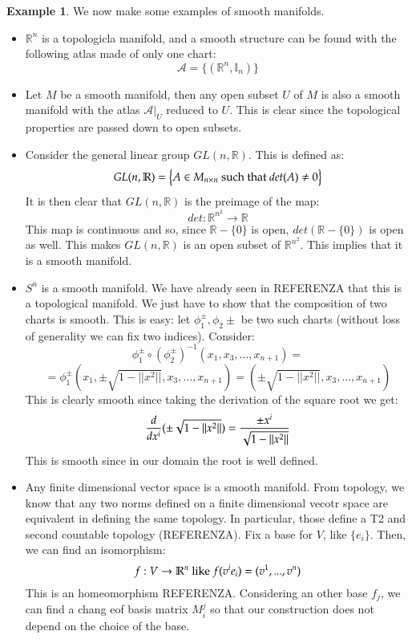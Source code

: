\documentclass[12pt,a4paper]{report}
\theoremstyle{definition}
\theoremstyle{Theorem}
\theoremstyle{break}
\newtheorem{Ex}[Def]{Example}
\theoremstyle{definition}
\begin{document}
		\begin{Ex}
			We now make some examples of smooth manifolds.
			\begin{itemize}
				\item $\mathbb{R}^n$ is a topologicla manifold, and a smooth structure can be found with the following atlas made of only one chart:
				$$\mathcal{A}=\{(\mathbb{R}^n,\mathbb{I}_n)\}$$
				\item Let $M$ be a smooth manifold, then any open subset $U$ of $M$ is also a smooth manifold with the atlas $\mathcal{A}\big|_U$ reduced to $U$. This is clear since the topological properties are passed down to open subsets.
				\item Consider the general linear group $GL(n,\mathbb{R})$. This is defined as:
				$$GL(n,\mathbb{R})=\big\{A\in M_{n\times n}\hbox{ such that }det(A)\neq 0\big\}$$
				It is then clear that $GL(n,\mathbb{R})$ is the preimage of the map:
				$$det:\mathbb{R}^{n^2}\longrightarrow \mathbb{R}$$ 
				This map is continuous and so, since $\mathbb{R}-\{0\}$ is open, $det(\mathbb{R}-\{0\})$ is open as well. This makes $GL(n,\mathbb{R})$ is an open subset of $\mathbb{R}^{n^2}$. This implies that it is a smooth manifold.
				\item $S^n$ is a smooth manifold. We have already seen in REFERENZA that this is a topological manifold. We just have to show that the composition of two charts is smooth. This is easy: let $\phi_1^\pm,\phi_2\pm$ be two such charts (without loss of generality we can fix two indices). Consider:
				$$\phi_1^{\pm}\circ(\phi_2^{\pm})^{-1}(x_1,x_3,...,x_{n+1})=$$$$=\phi^\pm_1(x_1,\pm\sqrt{1-||x^2||},x_3,...,x_{n+1})=(\pm\sqrt{1-||x^2||},x_3,...,x_{n+1})$$
				This is clearly smooth since taking the derivation of the square root we get:
				$${d\over dx^i}(\pm\sqrt{1-||x^2||})={\pm x^i\over\sqrt{1-||x^2||}}$$ 
				This is smooth since in our domain the root is well defined.
				\item Any finite dimensional vector space is a smooth manifold. From topology, we know that any two norms defined on a finite dimensional vecotr space are equivalent in defining the same topology. In particular, those define a T2 and second countable topology (REFERENZA). Fix a base for $V$, like $\{e_i\}$. Then, we can find an isomorphism:
				$$f:V\rightarrow \mathbb{R}^n\hbox{ like }f(v^ie_i)=(v^1,...,v^n)$$
				This is an homeomorphism REFERENZA. Considering an other base $f_j$, we can find a chang eof basis matrix $M^j_i$ so that our construction does not depend on the choice of the base.
			\end{itemize}
		\end{Ex}
\end{document}
